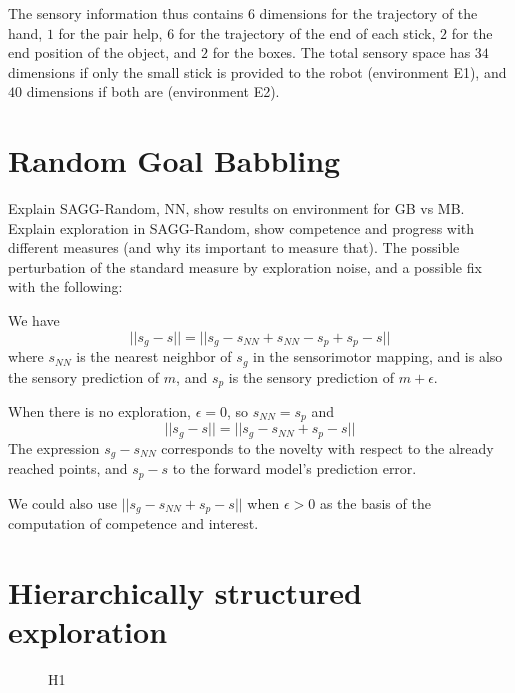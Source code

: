 \documentclass[conference]{include/IEEEtran}
\begin{document}
		The sensory information thus contains $6$ dimensions for the trajectory of the hand, $1$ for the pair help, $6$ for the trajectory of the end of each stick, $2$ for the end position of the object, and $2$ for the boxes.
		The total sensory space has $34$ dimensions if only the small stick is provided to the robot (environment E1), and $40$ dimensions if both are (environment E2).
		
	
	
%
	
\section{Random Goal Babbling}
\label{sec:saggrandom}

	Explain SAGG-Random, NN, show results on environment for GB vs MB.
	Explain exploration in SAGG-Random, show competence and progress with different measures (and why its important to measure that).
	The possible perturbation of the standard measure by exploration noise, and a possible fix with the following:


	We have $$||s_g - s|| = ||s_g - s_{NN} + s_{NN} - s_p + s_p - s||$$ where $s_{NN}$ is the nearest neighbor of $s_g$ in the sensorimotor mapping, and is also the sensory prediction of $m$, and $s_p$ is the sensory prediction of $m + \epsilon$.

	When there is no exploration, $\epsilon=0$, so $s_{NN} = s_p$ and $$||s_g - s|| = ||s_g - s_{NN} + s_p - s||$$
	The expression $s_g - s_{NN}$ corresponds to the novelty with respect to the already reached points, and $s_p - s$ to the forward model's prediction error.

	We could also use $||s_g - s_{NN} + s_p - s||$ when $\epsilon > 0$ as the basis of the computation of competence and interest.
	
%


\section{Hierarchically structured exploration}


	\begin{figure}[!t]
		\center
		
		\caption{H1}
		\label{H1}					
	\end{figure}
	
\end{document}

